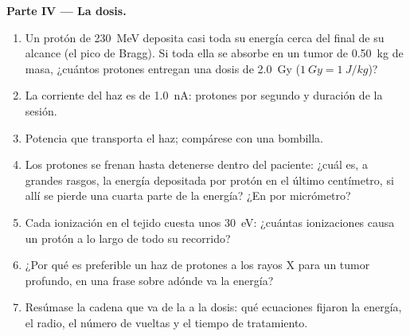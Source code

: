 \begin{problem}
\medskip
\noindent\textbf{Parte IV --- La dosis.}
\begin{enumerate}[resume]
  \item Un protón de \qty{230}{MeV} deposita casi toda su energía cerca
        del final de su alcance (el pico de Bragg). Si toda ella se
        absorbe en un tumor de \qty{0.50}{kg} de masa, ¿cuántos protones
        entregan una dosis de \qty{2.0}{Gy} ($\qty{1}{Gy} = \qty{1}{J/kg}$)?
  \item La corriente del haz es de \qty{1.0}{nA}: protones por segundo y
        duración de la sesión.
  \item Potencia que transporta el haz; compárese con una bombilla.
  \item Los protones se frenan hasta detenerse dentro del paciente: ¿cuál
        es, a grandes rasgos, la energía depositada por protón en el
        último centímetro, si allí se pierde una cuarta parte de la
        energía? ¿En  por micrómetro?
  \item Cada ionización en el tejido cuesta unos \qty{30}{eV}: ¿cuántas
        ionizaciones causa un protón a lo largo de todo su recorrido?
  \item ¿Por qué es preferible un haz de protones a los rayos X para un
        tumor profundo, en una frase sobre adónde va la energía?
  \item Resúmase la cadena que va de la  a la dosis: qué
        ecuaciones fijaron la energía, el radio, el número de vueltas y el
        tiempo de tratamiento.
\end{enumerate}
\end{problem}
